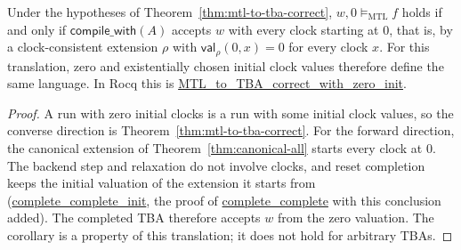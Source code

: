 \documentclass[manuscript]{acmart}
\newcommand{\satM}{\models_{\mathrm{MTL}}}
\newcommand{\CVal}{\mathsf{val}}
\newcommand{\Rocqid}[1]{\url{#1}}
\begin{document}
\begin{corollary}
\label{cor:zero-init}
Under the hypotheses of Theorem~\ref{thm:mtl-to-tba-correct}, $w,0\satM f$
holds if and only if $\mathsf{compile\_with}(A)$ accepts $w$ with every clock
starting at 0, that is, by a clock-consistent extension $\rho$ with
$\CVal_\rho(0,x)=0$ for every clock $x$. For this translation, zero and
existentially chosen initial clock values therefore define the same language.
In Rocq this is \Rocqid{MTL_to_TBA_correct_with_zero_init}.
\end{corollary}
\begin{proof}
A run with zero initial clocks is a run with some initial clock values, so the
converse direction is Theorem~\ref{thm:mtl-to-tba-correct}. For the forward
direction, the canonical extension of Theorem~\ref{thm:canonical-all} starts
every clock at 0. The backend step and relaxation do not involve clocks, and
reset completion keeps the initial valuation of the extension it starts from
(\Rocqid{complete_complete_init}, the proof of \Rocqid{complete_complete} with
this conclusion added). The completed TBA therefore accepts $w$ from the zero
valuation. The corollary is a property of this translation; it does not hold
for arbitrary TBAs.
\end{proof}
\end{document}
